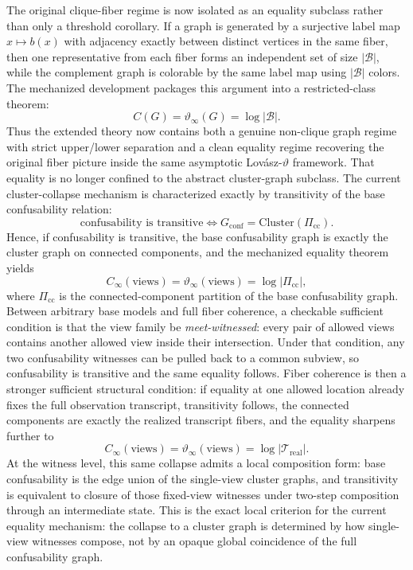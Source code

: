 The original clique-fiber regime is now isolated as an equality subclass rather than only a threshold corollary. If a graph is generated by a surjective label map $x \mapsto b(x)$ with adjacency exactly between distinct vertices in the same fiber, then one representative from each fiber forms an independent set of size $|\mathcal B|$, while the complement graph is colorable by the same label map using $|\mathcal B|$ colors. The mechanized development packages this argument into a restricted-class theorem:
\[
C(G)=\vartheta_{\infty}(G)=\log |\mathcal B|.
\]
Thus the extended theory now contains both a genuine non-clique graph regime with strict upper/lower separation and a clean equality regime recovering the original fiber picture inside the same asymptotic Lov\'asz-$\vartheta$ framework. That equality is no longer confined to the abstract cluster-graph subclass. The current cluster-collapse mechanism is characterized exactly by transitivity of the base confusability relation:
\[
\text{confusability is transitive}
\iff
G_{\mathrm{conf}}=\mathrm{Cluster}(\Pi_{\mathrm{cc}}).
\]
Hence, if confusability is transitive, the base confusability graph is exactly the cluster graph on connected components, and the mechanized equality theorem yields
\[
C_\infty(\text{views})=\vartheta_\infty(\text{views})=\log |\Pi_{\mathrm{cc}}|,
\]
where $\Pi_{\mathrm{cc}}$ is the connected-component partition of the base confusability graph. Between arbitrary base models and full fiber coherence, a checkable sufficient condition is that the view family be \emph{meet-witnessed}: every pair of allowed views contains another allowed view inside their intersection. Under that condition, any two confusability witnesses can be pulled back to a common subview, so confusability is transitive and the same equality follows. Fiber coherence is then a stronger sufficient structural condition: if equality at one allowed location already fixes the full observation transcript, transitivity follows, the connected components are exactly the realized transcript fibers, and the equality sharpens further to
\[
C_\infty(\text{views})=\vartheta_\infty(\text{views})=\log |\mathcal T_{\mathrm{real}}|.
\]
At the witness level, this same collapse admits a local composition form: base confusability is the edge union of the single-view cluster graphs, and transitivity is equivalent to closure of those fixed-view witnesses under two-step composition through an intermediate state. This is the exact local criterion for the current equality mechanism: the collapse to a cluster graph is determined by how single-view witnesses compose, not by an opaque global coincidence of the full confusability graph.

